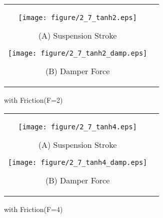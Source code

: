 \documentclass[a4paper,12pt]{article_vdlab_sotsuron}
\begin{document}
\vspace{2mm}
\begin{figure}[h]
    \begin{tabular}{cc}
      \begin{minipage}{0.45\hsize}
	\centering
	  \texttt{[image: figure/2\_7\_tanh2.eps]}
	  \begin{center}
	  \vspace{2mm}
	  \ (A) Suspension Stroke\
	  \end{center}
	\end{minipage}
       \begin{minipage}{0.5\hsize}
	\centering
	  \texttt{[image: figure/2\_7\_tanh2\_damp.eps]}
	  \begin{center}
	  \vspace{2mm}
	  \ (B) Damper Force\
	  \end{center}
      \end{minipage}
    \end{tabular}
    \vspace{2mm}
    \caption{with Friction(F=2)}
    \label{fig:tanh2}
\end{figure}

\vspace{2mm}
\begin{figure}[h]
    \begin{tabular}{cc}
      \begin{minipage}{0.45\hsize}
	\centering
	  \texttt{[image: figure/2\_7\_tanh4.eps]}
	  \begin{center}
	  \vspace{2mm}
	  \ (A) Suspension Stroke\
	  \end{center}
	\end{minipage}
       \begin{minipage}{0.5\hsize}
	\centering
	  \texttt{[image: figure/2\_7\_tanh4\_damp.eps]}
	  \begin{center}
	  \vspace{2mm}
	  \ (B) Damper Force\
	  \end{center}
      \end{minipage}
    \end{tabular}
    \vspace{2mm}
    \caption{with Friction(F=4)}
    \label{fig:tanh4}
\end{figure}
\end{document}
